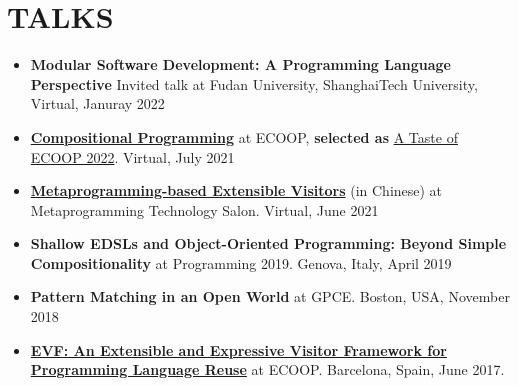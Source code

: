 \documentclass[paper=letter,fontsize=11pt]{scrartcl} %
\newcommand{\NewPart}[2]{\section*{\uppercase{#1} #2}}
\begin{document}
\NewPart{Talks}{}
\begin{itemize}
\item {\textbf{Modular Software Development: A Programming Language Perspective}} Invited talk at Fudan University, ShanghaiTech University, Virtual, Januray 2022
\item \href{https://www.youtube.com/watch?v=fBlHIXWIPhw}{\textbf{Compositional Programming}} at ECOOP, \textbf{selected as} \href{https://2021.ecoop.org/track/ecoop-2021-ecoop-research-papers#event-overview}{A Taste of ECOOP 2022}. Virtual, July 2021
\item \href{https://www.bilibili.com/s/video/BV1Cy4y1M7xC}{\textbf{Metaprogramming-based Extensible Visitors}} (in Chinese) at Metaprogramming Technology Salon. Virtual, June 2021
\item \textbf{Shallow EDSLs and Object-Oriented Programming: Beyond Simple Compositionality} at Programming 2019. Genova, Italy, April 2019
\item \textbf{Pattern Matching in an Open World} at GPCE. Boston, USA, November 2018
\item \href{https://www.youtube.com/watch?v=ibGaxqNNfrs}{\textbf{EVF: An Extensible and Expressive Visitor Framework for Programming Language Reuse}} at ECOOP. Barcelona, Spain, June 2017.
\end{itemize}
\end{document}
